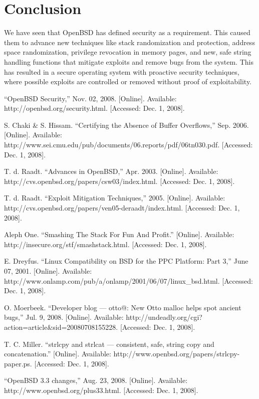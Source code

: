 \documentclass[12pt]{article}
\begin{document}
{\section*{Conclusion}

We have seen that OpenBSD has defined security as a requirement. This caused them to advance new techniques like stack randomization and protection, address space randomization, privilege revocation in memory pages, and new, safe string handling functions that mitigate exploits and remove bugs from the system. This has resulted in a secure operating system with proactive security techniques, where possible exploits are controlled or removed without proof of exploitability.

}

\begin{thebibliography}{99}

 ``OpenBSD Security,'' Nov. 02, 2008. [Online]. Available: \\ http://openbsd.org/security.html. [Accessed: Dec. 1, 2008].

 S. Chaki \& S. Hissam. ``Certifying the Absence of Buffer Overflows,'' Sep. 2006. [Online]. Available: http://www.sei.cmu.edu/pub/documents/06.reports/pdf/06tn030.pdf. [Accessed: Dec. 1, 2008].

 T. d. Raadt. ``Advances in OpenBSD,'' Apr. 2003. [Online]. Available: http://cvs.openbsd.org/papers/csw03/index.html. [Accessed: Dec. 1, 2008].

 T. d. Raadt. ``Exploit Mitigation Techniques,'' 2005. [Online]. Available: http://cvs.openbsd.org/papers/ven05-deraadt/index.html. [Accessed: Dec. 1, 2008].

 Aleph One. ``Smashing The Stack For Fun And Profit.'' [Online]. Available: http://insecure.org/stf/smashstack.html. [Accessed: Dec. 1, 2008].

 E. Dreyfus. ``Linux Compatibility on BSD for the PPC Platform: Part 3,'' June 07, 2001. [Online]. Available: http://www.onlamp.com/pub/a/onlamp/2001/06/07/linux\_bsd.html. [Accessed: Dec. 1, 2008].

 O. Moerbeek. ``Developer blog --- otto@: New Otto malloc helps spot ancient bugs,'' Jul. 9, 2008. [Online]. Available: http://undeadly.org/cgi?action=article\&sid=20080708155228. [Accessed: Dec. 1, 2008].

 T. C. Miller. ``strlcpy and strlcat --- consistent, safe, string copy and concatenation.'' [Online]. Available: http://www.openbsd.org/papers/strlcpy-paper.ps. [Accessed: Dec. 1, 2008].

 ``OpenBSD 3.3 changes,'' Aug. 23, 2008. [Online]. Available: http://www.openbsd.org/plus33.html. [Accessed: Dec. 1, 2008].

\end{thebibliography}
\end{document}
